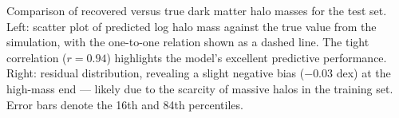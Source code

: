 Comparison of recovered versus true dark matter halo masses for the test set. Left: scatter plot of predicted log halo mass against the true value from the simulation, with the one-to-one relation shown as a dashed line. The tight correlation ($r = 0.94$) highlights the model's excellent predictive performance. Right: residual distribution, revealing a slight negative bias ($-0.03$ dex) at the high-mass end — likely due to the scarcity of massive halos in the training set. Error bars denote the 16th and 84th percentiles.
